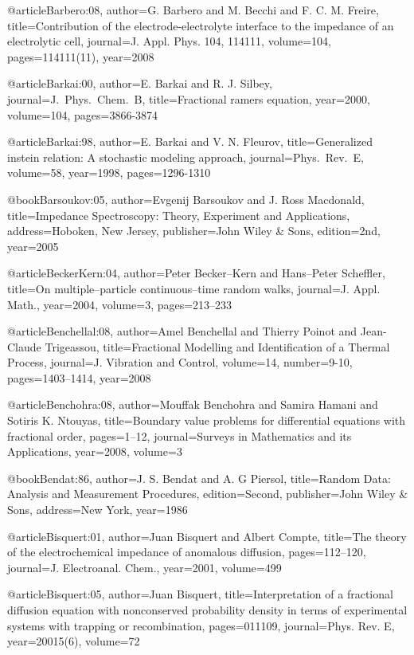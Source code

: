 \begin{thebibliography}{99}
@article{Barbero:08,
  author={G. Barbero and M. Becchi and F. C. M. Freire},
  title={Contribution of the electrode-electrolyte interface to the impedance of
    an electrolytic cell},
  journal={J. Appl. Phys. 104, 114111},
  volume={104},
  pages={114111(11)},
  year={2008}
}

@article{Barkai:00,
  author={E. Barkai and R. J. Silbey},
  journal={J.\ Phys.\ Chem.\ B},
  title={Fractional ramers equation},
  year={2000},
  volume={104},
  pages={3866-3874}
}

@article{Barkai:98,
  author={E. Barkai and V. N. Fleurov},
  title={Generalized instein relation: A stochastic modeling approach},
  journal={Phys.\ Rev.\ E},
  volume={58},
  year={1998},
  pages={1296-1310}
}

@book{Barsoukov:05,
  author={Evgenij Barsoukov and J. Ross Macdonald},
  title={Impedance Spectroscopy: Theory, Experiment and Applications},
  address={Hoboken, New Jersey},
  publisher={John Wiley {\&} Sons},
  edition={2nd},
  year={2005}
}

@article{BeckerKern:04,
  author={Peter Becker--Kern and Hans--Peter Scheffler},
  title={On multiple--particle continuous--time random walks},
  journal={J. Appl. Math.},
  year={2004},
  volume={3},
  pages={213--233}
}

@article{Benchellal:08,
  author={Amel Benchellal and Thierry Poinot and Jean-Claude Trigeassou},
  title={Fractional Modelling and Identification of a Thermal Process},
  journal={J. Vibration and Control},
  volume={14},
  number={9-10},
  pages={1403--1414},
  year={2008}
}

@article{Benchohra:08,
  author={Mouffak Benchohra and Samira Hamani and Sotiris K. Ntouyas},
  title={Boundary value problems for differential equations with fractional order},
  pages={1--12},
  journal={Surveys in Mathematics and its Applications},
  year={2008},
  volume={3}
}

@book{Bendat:86,
  author={J. S. Bendat and A. G Piersol},
  title={Random Data: Analysis and Measurement Procedures},
  edition={Second},
  publisher={John Wiley {\&} Sons},
  address={New York},
  year={1986}
}

@article{Bisquert:01,
  author={Juan Bisquert and Albert Compte},
  title={The theory of the electrochemical impedance of anomalous diffusion},
  pages={112--120},
  journal={J. Electroanal. Chem.},
  year={2001},
  volume={499}
}

@article{Bisquert:05,
  author={Juan Bisquert},
  title={Interpretation of a fractional diffusion equation with nonconserved probability
    density in terms of experimental systems with trapping or recombination},
  pages={011109},
  journal={Phys. Rev. E},
  year={20015(6)},
  volume={72}
}


\end{thebibliography}
